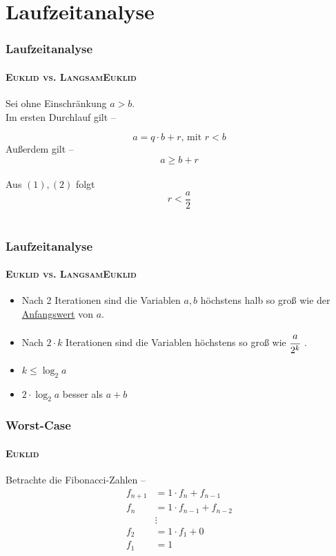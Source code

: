 \documentclass[•]{beamer}
\begin{document}
\section{Laufzeitanalyse}

\begin{frame}
	\frametitle{Laufzeitanalyse}
	\framesubtitle{\textsc{Euklid vs. LangsamEuklid}}
	Sei ohne Einschr\"ankung $a>b$.\\ Im ersten Durchlauf gilt --
	
	\begin{equation}a = q \cdot b + r \text{, mit } r < b
	\end{equation}
	 Au{\ss}erdem gilt -- \\ \begin{equation}a \geq b + r \end{equation} \\
	 Aus $(1), (2)$ folgt $$r < \frac{a}{2}$$ \\
\end{frame}	
\begin{frame}
	\frametitle{Laufzeitanalyse}
	\framesubtitle{\textsc{Euklid vs. LangsamEuklid}}
	\begin{itemize}
	\item Nach 2 Iterationen sind die Variablen $a,b$ h\"ochstens halb so gro{\ss} wie der \underline{Anfangswert} von $a$. \vspace{15pt}
	\item Nach $2 \cdot k$ Iterationen sind die Variablen h\"ochstens so gro{\ss} wie $\cfrac{a}{2^k}$ \vspace{15pt} .	
	\item $k \leq \log_{2}a$
	\item $2\cdot \log_{2}a$ besser als $a+b$
	\end{itemize}
\end{frame}

	\begin{frame}
	\frametitle{Worst-Case}
	\framesubtitle{\textsc{Euklid}}

	Betrachte die Fibonacci-Zahlen --
	\begin{align*}
 f_{n+1} &= 1 \cdot f_{n} + f_{n-1} \\
 f_{n} &= 1 \cdot f_{n-1} + f_{n-2} \\
 &\vdots \\
 f_{2} &= 1 \cdot f_{1} + 0 \\
 f_{1} &= 1
\end{align*}
\end{frame}	
\end{document}
